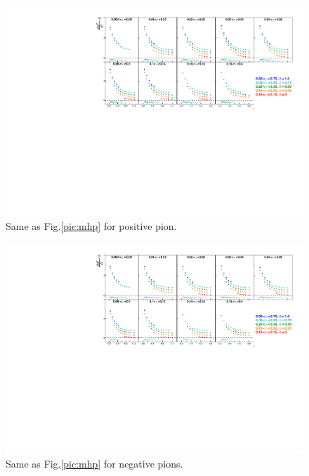 \begin{figure}[!h]
  \centering
	\includegraphics[scale=0.85]{./gfx/pip.pdf}
	\caption{Same as Fig.\ref{pic:mhp} for positive pion.}
	\label{pic:mpip}
\end{figure}
\vfill

\newpage
\null
\vfill
\begin{figure}[!h]
  \centering
	\includegraphics[scale=0.85]{./gfx/pim.pdf}
	\caption{Same as Fig.\ref{pic:mhp} for negative pions.}
	\label{pic:mpim}
\end{figure}

